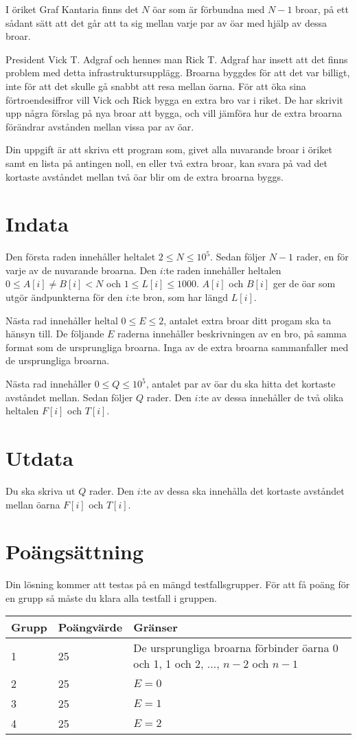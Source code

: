 I öriket Graf Kantaria finns det $N$ öar som är förbundna med $N - 1$ broar, på ett sådant sätt att det går att ta sig mellan varje par av öar med hjälp av dessa broar.

President Vick T. Adgraf och hennes man Rick T. Adgraf har insett att det finns problem med detta infrastruktursupplägg.
Broarna byggdes för att det var billigt, inte för att det skulle gå snabbt att resa mellan öarna.
För att öka sina förtroendesiffror vill Vick och Rick bygga en extra bro var i riket.
De har skrivit upp några förslag på nya broar att bygga, och vill jämföra hur de extra broarna förändrar avstånden mellan vissa par av öar.

Din uppgift är att skriva ett program som, givet alla nuvarande broar i öriket samt en lista på antingen noll, en eller två extra broar, kan svara på vad det kortaste avståndet mellan två öar blir om de extra broarna byggs.

\section*{Indata}
Den första raden innehåller heltalet $2 \le N \le 10^5$.
Sedan följer $N - 1$ rader, en för varje av de nuvarande broarna.
Den $i$:te raden innehåller heltalen $0 \le A[i] \not= B[i] < N$ och $1 \le L[i] \le 1000$.
$A[i]$ och $B[i]$ ger de öar som utgör ändpunkterna för den $i$:te bron, som har längd $L[i]$.

Nästa rad innehåller heltal $0 \le E \le 2$, antalet extra broar ditt progam ska ta hänsyn till.
De följande $E$ raderna innehåller beskrivningen av en bro, på samma format som de ursprungliga broarna.
Inga av de extra broarna sammanfaller med de ursprungliga broarna.

Nästa rad innehåller $0 \le Q \le 10^5$, antalet par av öar du ska hitta det kortaste avståndet mellan.
Sedan följer $Q$ rader.
Den $i$:te av dessa innehåller de två olika heltalen $F[i]$ och $T[i]$.

\section*{Utdata}
Du ska skriva ut $Q$ rader.
Den $i$:te av dessa ska innehålla det kortaste avståndet mellan öarna $F[i]$ och $T[i]$.

\section*{Poängsättning}
Din lösning kommer att testas på en mängd testfallsgrupper. För att få poäng för en grupp
så måste du klara alla testfall i gruppen.

\noindent
\begin{tabular}{| l | l | l |}
\hline
Grupp & Poängvärde & Gränser \\ \hline
	1     & 25         & De ursprungliga broarna förbinder öarna 0 och 1, 1 och 2, $\dots$, $n - 2$ och $n - 1$\\ \hline
	2     & 25         & $E = 0$ \\ \hline
	3     & 25         & $E = 1$ \\ \hline
	4     & 25         & $E = 2$ \\ \hline
\end{tabular}
